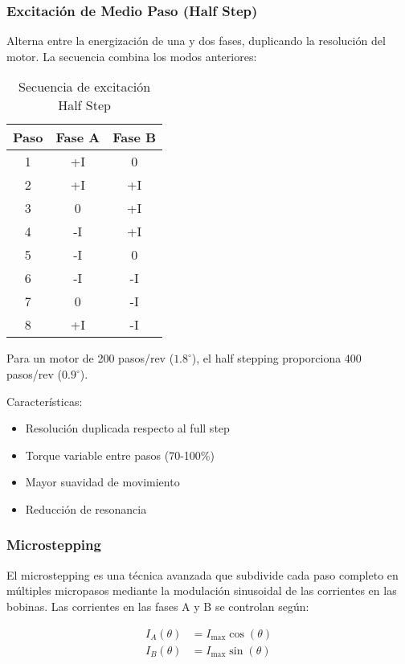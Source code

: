 \subsubsection{Excitación de Medio Paso (Half Step)}

Alterna entre la energización de una y dos fases, duplicando la resolución del motor. La secuencia combina los modos anteriores:

\begin{table}[ht]
\centering
\caption{Secuencia de excitación Half Step}
\begin{tabular}{|c|c|c|}
\hline
\textbf{Paso} & \textbf{Fase A} & \textbf{Fase B} \\
\hline
1 & +I & 0 \\
2 & +I & +I \\
3 & 0 & +I \\
4 & -I & +I \\
5 & -I & 0 \\
6 & -I & -I \\
7 & 0 & -I \\
8 & +I & -I \\
\hline
\end{tabular}
\end{table}

Para un motor de 200 pasos/rev ($1.8^\circ$), el half stepping proporciona 400 pasos/rev ($0.9^\circ$).

Características:
\begin{itemize}
    \item Resolución duplicada respecto al full step
    \item Torque variable entre pasos (70-100\%)
    \item Mayor suavidad de movimiento
    \item Reducción de resonancia
\end{itemize}

\subsubsection{Microstepping}

El microstepping es una técnica avanzada que subdivide cada paso completo en múltiples micropasos mediante la modulación sinusoidal de las corrientes en las bobinas. Las corrientes en las fases A y B se controlan según:

\begin{equation}
\begin{aligned}
I_A(\theta) &= I_{\max} \cos(\theta) \\
I_B(\theta) &= I_{\max} \sin(\theta)
\end{aligned}
\end{equation}

